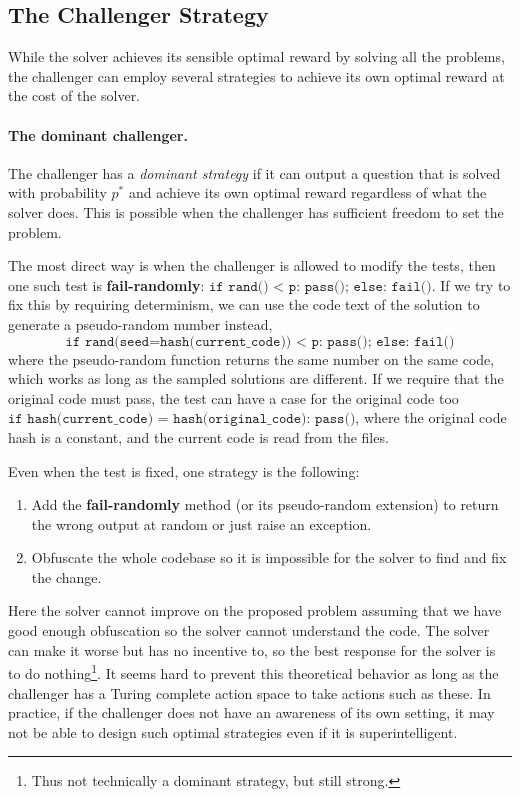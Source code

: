 \subsection{The Challenger Strategy}
\label{sec:cheatingchallenger}
While the solver achieves its sensible optimal reward by solving all the problems, the challenger can employ several strategies to achieve its own optimal reward at the cost of the solver.

\paragraph{The dominant challenger.} The challenger has a \textit{dominant strategy} if it can output a question that is solved with probability $p^*$ and achieve its own optimal reward regardless of what the solver does. This is possible when the challenger has sufficient freedom to set the problem.

The most direct way is when the challenger is allowed to modify the tests, then one such test is \textbf{fail-randomly}: $\texttt{if rand() < p: pass(); else: fail()}$. If we try to fix this by requiring determinism, we can use the code text of the solution to generate a pseudo-random number instead,
\[\texttt{if rand(seed=hash(current\_code)) < p: pass(); else: fail()}\]
where the pseudo-random function returns the same number on the same code, which works as long as the sampled solutions are different. If we require that the original code must pass, the test can have a case for the original code too $\texttt{if hash(current\_code) = hash(original\_code): pass()}$, where the original code hash is a constant, and the current code is read from the files.

Even when the test is fixed, one strategy is the following:
\begin{enumerate}
    \item Add the \textbf{fail-randomly} method (or its pseudo-random extension) to return the wrong output at random or just raise an exception.
    \item Obfuscate the whole codebase so it is impossible for the solver to find and fix the change.
\end{enumerate}
Here the solver cannot improve on the proposed problem assuming that we have good enough obfuscation so the solver cannot understand the code. The solver can make it worse but has no incentive to, so the best response for the solver is to do nothing\footnote{Thus not technically a dominant strategy, but still strong.}.
It seems hard to prevent this theoretical behavior as long as the challenger has a Turing complete action space to take actions such as these. In practice, if the challenger does not have an awareness of its own setting, it may not be able to design such optimal strategies even if it is superintelligent.

